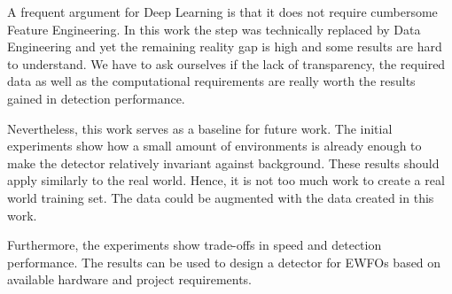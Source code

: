 A frequent argument for Deep Learning is that it does not require cumbersome Feature Engineering. In this work the step was technically replaced by Data Engineering and yet the remaining reality gap is high and some results are hard to understand. We have to ask ourselves if the lack of transparency, the required data as well as the computational requirements are really worth the results gained in detection performance.

Nevertheless, this work serves as a baseline for future work. The initial experiments show how a small amount of environments is already enough to make the detector relatively invariant against background. These results should apply similarly to the real world. Hence, it is not too much work to create a real world training set. The data could be augmented with the data created in this work.

Furthermore, the experiments show trade-offs in speed and detection performance. The results can be used to design a detector for \acp{EWFO} based on available hardware and project requirements.




